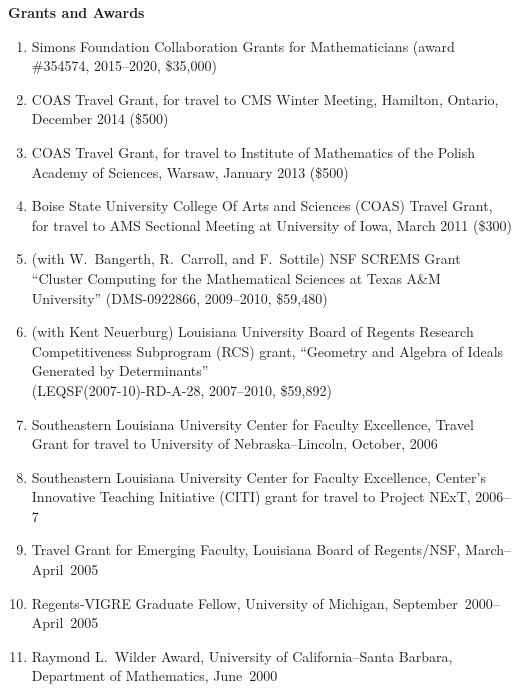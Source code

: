\documentclass[12pt]{article}
\begin{document}
\textbf{Grants and Awards}
\begin{enumerate}[revarabic,labelwidth=*]
\item Simons Foundation Collaboration Grants for Mathematicians (award \#354574, 2015--2020, \$35,000)
\item COAS Travel Grant, for travel to CMS Winter Meeting, Hamilton, Ontario, December 2014 (\$500)
\item COAS Travel Grant, for travel to Institute of Mathematics of the Polish Academy of Sciences, Warsaw, January 2013 (\$500)
\item Boise State University College Of Arts and Sciences (COAS) Travel Grant, for travel to AMS Sectional Meeting at University of Iowa, March 2011 (\$300)
\item (with W.~Bangerth, R.~Carroll, and F.~Sottile)
NSF SCREMS Grant ``Cluster Computing for the 
Mathematical Sciences at Texas A\&M University''
(DMS-0922866, 2009--2010, \$59,480)
\item (with Kent Neuerburg)
Louisiana University Board of Regents Research Competitiveness Subprogram (RCS) grant,
``Geometry and Algebra of Ideals Generated by Determinants'' \\
(LEQSF(2007-10)-RD-A-28, 2007--2010, \$59,892)
\item Southeastern Louisiana University Center for Faculty Excellence, Travel Grant for travel to University of Nebraska--Lincoln,
October, 2006
\item Southeastern Louisiana University Center for Faculty Excellence, Center's Innovative Teaching Initiative (CITI) grant
for travel to Project NExT, 2006--7
\item Travel Grant for Emerging Faculty, Louisiana Board of Regents/NSF, 
March--April~2005
\item Regents-VIGRE Graduate Fellow, University of Michigan, 
September~2000--April~2005
\item Raymond L.~Wilder Award, University of California--Santa Barbara,
Department of Mathematics, 
June~2000
\end{enumerate}
\end{document}
